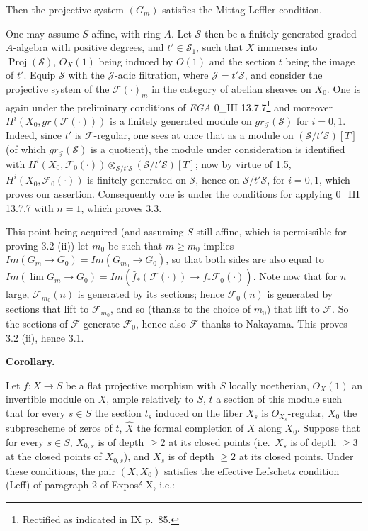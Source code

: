 \documentclass[
  11pt,
  a4paper,
]{book}
\begin{document}
Then the projective system \((G_{m})\) satisfies the Mittag-Leffler
condition.

One may assume \(S\) affine, with ring \(A\). Let \(\mathcal{S}\) then
be a finitely generated graded \(A\)-algebra with positive degrees, and
\(t' \in \mathcal{S}_{1}\), such that \(X\) immerses into
\(\operatorname{Proj}(\mathcal{S})\), \(O_{X}(1)\) being induced by
\(O(1)\) and the section \(t\) being the image of \(t'\). Equip
\(\mathcal{S}\) with the \(\mathcal{J}\)-adic filtration, where
\(\mathcal{J} = t'\mathcal{S}\), and consider the projective system of
the \(\mathcal{F}(\cdot)_{m}\) in the category of abelian sheaves on
\(X_{0}\). One is again under the preliminary conditions of \emph{EGA}
0\_III 13.7.7\footnote{Rectified as indicated in IX p.~85.} and moreover
\(H^{i}(X_{0}, gr(\mathcal{F}(\cdot)))\) is a finitely generated module
on \(gr_{\mathcal{J}}(\mathcal{S})\) for \(i = 0, 1\). Indeed, since
\(t'\) is \(\mathcal{F}\)-regular, one sees at once that as a module on
\((\mathcal{S}/t'\mathcal{S})[T]\) (of which
\(gr_{\mathcal{J}}(\mathcal{S})\) is a quotient), the module under
consideration is identified with
\(H^{i}(X_{0}, \mathcal{F}_{0}(\cdot)) \otimes_{\mathcal{S}/t'\mathcal{S}}
(\mathcal{S}/t'\mathcal{S})[T]\); now by virtue of 1.5,
\(H^{i}(X_{0}, \mathcal{F}_{0}(\cdot))\) is finitely generated on
\(\mathcal{S}\), hence on \(\mathcal{S}/t'\mathcal{S}\), for
\(i = 0, 1\), which proves our assertion. Consequently one is under the
conditions for applying 0\_III 13.7.7 with \(n = 1\), which proves 3.3.

This point being acquired (and assuming \(S\) still affine, which is
permissible for proving 3.2 (ii)) let \(m_{0}\) be such that
\(m \geqslant m_{0}\) implies
\(Im(G_{m} \to G_{0}) = Im(G_{m_{0}} \to G_{0})\), so that both sides
are also equal to
\(Im(\lim G_{m} \to G_{0}) = Im(\hat{f}_{\ast}(\mathcal{F}(\cdot)) \to f_{\ast }\mathcal{F}_{0}(\cdot))\).
Note now that for \(n\) large, \(\mathcal{F}_{m_{0}}(n)\) is generated
by its sections; hence \(\mathcal{F}_{0}(n)\) is generated by sections
that lift to \(\mathcal{F}_{m_{0}}\), and so (thanks to the choice of
\(m_{0}\)) that lift to \(\mathcal{F}\). So the sections of
\(\mathcal{F}\) generate \(\mathcal{F}_{0}\), hence also \(\mathcal{F}\)
thanks to Nakayama. This proves 3.2 (ii), hence 3.1.

\textbf{Corollary.}

Let \(f: X \to S\) be a flat projective morphism with \(S\) locally
noetherian, \(O_{X}(1)\) an invertible module on \(X\), ample relatively
to \(S\), \(t\) a section of this module such that for every \(s \in S\)
the section \(t_{s}\) induced on the fiber \(X_{s}\) is
\(O_{X_{s}}\)-regular, \(X_{0}\) the subprescheme of zeros of \(t\),
\(\hat{X}\) the formal completion of \(X\) along \(X_{0}\). Suppose that
for every \(s \in S\), \(X_{0,s}\) is of depth \(\geqslant 2\) at its
closed points (i.e.~\(X_{s}\) is of depth \(\geqslant 3\) at the closed
points of \(X_{0,s}\)), and \(X_{s}\) is of depth \(\geqslant 2\) at its
closed points. Under these conditions, the pair \((X, X_{0})\) satisfies
the effective Lefschetz condition (Leff) of paragraph 2 of Exposé X,
i.e.:
\end{document}
